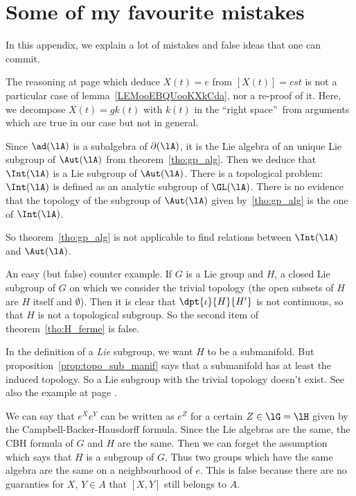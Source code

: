 \section{Some of my favourite mistakes}

In this appendix, we explain a lot of mistakes and false ideas that one can commit.

\begin{erreur}\label{err:decomp}
	The reasoning at page \pageref{pg:X_t} which deduce $X(t)=e$ from $[X(t)]=cst$ is not a particular case of lemma~\ref{LEMooEBQUooKXkCda}, nor a re-proof of it. Here, we decompose $X(t)=gk(t)$ with $k(t)$ in the ``right space''\ from arguments which are true in our case but not in general.
\end{erreur}

\begin{erreur}\label{err:Intt_Aut}
	Since $\ad(\lA)$ is a subalgebra of $\partial(\lA)$, it is the Lie algebra of an unique Lie subgroup of $\Aut(\lA)$ from theorem~\ref{tho:gp_alg}. Then we deduce that $\Int(\lA)$ is a Lie subgroup of $\Aut(\lA)$. There is a topological problem: $\Int(\lA)$ is defined as an analytic subgroup of $\GL(\lA)$. There is no evidence that the topology of the subgroup of $\Aut(\lA)$ given by~\ref{tho:gp_alg} is the one of $\Int(\lA)$.

	So theorem~\ref{tho:gp_alg} is not applicable to find relations between $\Int(\lA)$ and $\Aut(\lA)$.
\end{erreur}

\begin{erreur}\label{err:gross}
	An easy (but false) counter example. If $G$ is a Lie group and $H$, a closed Lie subgroup of $G$ on which we consider the trivial topology (the open subsets of $H$ are $H$ itself and $\emptyset$). Then it is clear that $\dpt{\iota}{H}{H'}$ is not continuous, so that $H$ is not a topological subgroup. So the second item of theorem~\ref{tho:H_ferme} is false.

	In the definition of a \emph{Lie} subgroup, we want $H$ to be a submanifold. But proposition~\ref{prop:topo_sub_manif} says that a submanifold has at least the induced topology. So a Lie subgroup with the trivial topology doesn't exist. See also the example at page \pageref{pg:ex_topo_Lie}.
\end{erreur}

\begin{erreur}\label{err:gp_meme_alg}
	We can say that $e^Xe^Y$ can be written as $e^Z$ for a certain $Z\in\lG=\lH$ given by the Campbell-Backer-Hausdorff formula. Since the Lie algebras are the same, the CBH formula of $G$ and $H$ are the same. Then we can forget the assumption which says that $H$ is a subgroup of $G$. Thus two groups which have the same algebra are the same on a neighbourhood of $e$. This is false because there are no guaranties for $X$, $Y\in A$ that $[X,Y]$ still belongs to $A$.
\end{erreur}

